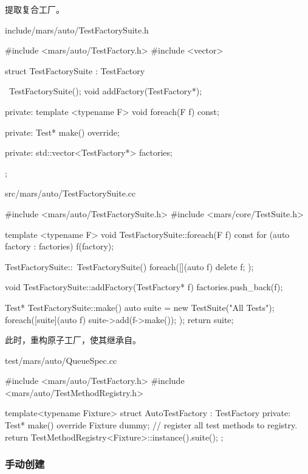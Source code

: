 \begin{content}
提取复合工厂。

\begin{nodiff}{include/mars/auto/TestFactorySuite.h}
 \begin{c++}
#include <mars/auto/TestFactory.h>
#include <vector>

struct TestFactorySuite : TestFactory {
  ~TestFactorySuite();
  void addFactory(TestFactory*);

private:
  template <typename F>
  void foreach(F f) const;

private:
  Test* make() override;

private:
  std::vector<TestFactory*> factories;
};
 \end{c++}
\end{nodiff}

\begin{nodiff}{src/mars/auto/TestFactorySuite.cc}
 \begin{c++}
#include <mars/auto/TestFactorySuite.h>
#include <mars/core/TestSuite.h>

template <typename F>
void TestFactorySuite::foreach(F f) const {
  for (auto factory : factories) {
    f(factory);
  }
}

TestFactorySuite::~TestFactorySuite() {
  foreach([](auto f){
    delete f;
  });
}

void TestFactorySuite::addFactory(TestFactory* f) {
  factories.push_back(f);
}

Test* TestFactorySuite::make() {
  auto suite = new TestSuite("All Tests");
  foreach([suite](auto f){
    suite->add(f->make());
  });
  return suite;
}
 \end{c++}
\end{nodiff}

此时，重构原子工厂，使其继承自。

\begin{nodiff}{test/mars/auto/QueueSpec.cc}
 \begin{c++}
#include <mars/auto/TestFactory.h> 
#include <mars/auto/TestMethodRegistry.h>

template<typename Fixture>
struct AutoTestFactory : TestFactory {
private:
  Test* make() override {
    Fixture dummy; // register all test methods to registry.
    return TestMethodRegistry<Fixture>::instance().suite();
  }
};
 \end{c++}
\end{nodiff}

\subsubsection{手动创建}


\end{content}
